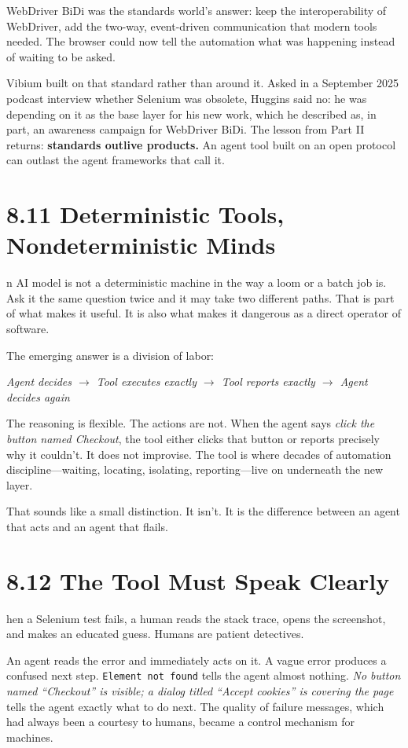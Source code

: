 \documentclass[11pt, a4paper, openany]{book}
\newcommand{\initialcap}[1]{{\fontfamily{lmss}\selectfont\huge\textbf{#1}}}
\begin{document}
WebDriver BiDi was the standards world's answer: keep the interoperability of WebDriver, add the two-way, event-driven communication that modern tools needed. The browser could now tell the automation what was happening instead of waiting to be asked.

Vibium built on that standard rather than around it. Asked in a September 2025 podcast interview whether Selenium was obsolete, Huggins said no: he was depending on it as the base layer for his new work, which he described as, in part, an awareness campaign for WebDriver BiDi. The lesson from Part II returns: \textbf{standards outlive products.} An agent tool built on an open protocol can outlast the agent frameworks that call it.

\section{8.11 Deterministic Tools, Nondeterministic Minds}
\noindent \initialcap{A}n AI model is not a deterministic machine in the way a loom or a batch job is. Ask it the same question twice and it may take two different paths. That is part of what makes it useful. It is also what makes it dangerous as a direct operator of software.

The emerging answer is a division of labor:
\begin{center}
\textit{Agent decides $\rightarrow$ Tool executes exactly $\rightarrow$ Tool reports exactly $\rightarrow$ Agent decides again}
\end{center}
The reasoning is flexible. The actions are not. When the agent says \textit{click the button named Checkout}, the tool either clicks that button or reports precisely why it couldn't. It does not improvise. The tool is where decades of automation discipline---waiting, locating, isolating, reporting---live on underneath the new layer.

That sounds like a small distinction. It isn't. It is the difference between an agent that acts and an agent that flails.

\section{8.12 The Tool Must Speak Clearly}
\noindent \initialcap{W}hen a Selenium test fails, a human reads the stack trace, opens the screenshot, and makes an educated guess. Humans are patient detectives.

An agent reads the error and immediately acts on it. A vague error produces a confused next step. \texttt{Element not found} tells the agent almost nothing. \textit{No button named ``Checkout'' is visible; a dialog titled ``Accept cookies'' is covering the page} tells the agent exactly what to do next. The quality of failure messages, which had always been a courtesy to humans, became a control mechanism for machines.
\end{document}
